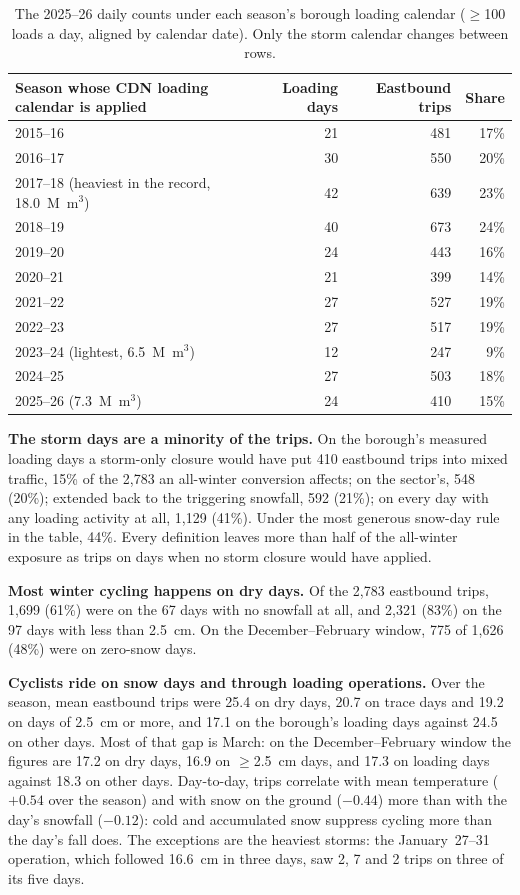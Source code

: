 \documentclass[11pt,letterpaper]{article}
\begin{document}
\begin{table}[htbp]
\centering\small
\begin{tabular}{lrrr}
\toprule
Season whose CDN loading calendar is applied & Loading days & Eastbound trips & Share \\
\midrule
2015--16 & 21 & 481 & 17\% \\
2016--17 & 30 & 550 & 20\% \\
2017--18 (heaviest in the record, 18.0~M~m$^3$) & 42 & 639 & 23\% \\
2018--19 & 40 & 673 & 24\% \\
2019--20 & 24 & 443 & 16\% \\
2020--21 & 21 & 399 & 14\% \\
2021--22 & 27 & 527 & 19\% \\
2022--23 & 27 & 517 & 19\% \\
2023--24 (lightest, 6.5~M~m$^3$) & 12 & 247 & 9\% \\
2024--25 & 27 & 503 & 18\% \\
2025--26 (7.3~M~m$^3$) & 24 & 410 & 15\% \\
\bottomrule
\end{tabular}
\caption{The 2025--26 daily counts under each season's borough loading
calendar ($\geq$100 loads a day, aligned by calendar date). Only the storm
calendar changes between rows.}
\end{table}

\textbf{The storm days are a minority of the trips.} On the borough's
measured loading days a storm-only closure would have put 410 eastbound
trips into mixed traffic, 15\% of the 2{,}783 an all-winter conversion
affects; on the sector's, 548 (20\%); extended back to the triggering
snowfall, 592 (21\%); on every day with any loading activity at all,
1{,}129 (41\%). Under the most generous snow-day rule in the table, 44\%.
Every definition leaves more than half of the all-winter exposure as trips
on days when no storm closure would have applied.

\textbf{Most winter cycling happens on dry days.} Of the 2{,}783 eastbound
trips, 1{,}699 (61\%) were on the 67 days with no snowfall at all, and
2{,}321 (83\%) on the 97 days with less than 2.5~cm. On the
December--February window, 775 of 1{,}626 (48\%) were on zero-snow days.

\textbf{Cyclists ride on snow days and through loading operations.} Over
the season, mean eastbound trips were 25.4 on dry days, 20.7 on trace days
and 19.2 on days of 2.5~cm or more, and 17.1 on the borough's loading days
against 24.5 on other days. Most of that gap is March: on the
December--February window the figures are 17.2 on dry days, 16.9 on
$\geq$2.5~cm days, and 17.3 on loading days against 18.3 on other days.
Day-to-day, trips correlate with mean temperature ($+0.54$ over the
season) and with snow on the ground ($-0.44$) more than with the day's
snowfall ($-0.12$): cold and accumulated snow suppress cycling more than
the day's fall does. The exceptions are the heaviest storms: the
January~27--31 operation, which followed 16.6~cm in three days, saw 2, 7
and 2 trips on three of its five days.
\end{document}
